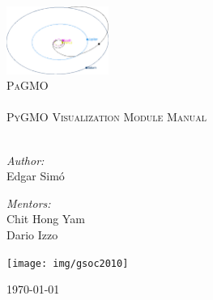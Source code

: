 \begin{titlepage}

\begin{center}

\vfill

\vspace*{2 cm}

\includegraphics[width=0.25\textwidth]{img/cover}\\[1cm]

\textsc{\LARGE PaGMO}\\[0.5cm]
\HRule \\[0.5cm]
\textsc{\Large PyGMO Visualization Module Manual}\\[0.5cm]
\HRule \\[1.5cm]


\begin{minipage}{0.4\textwidth}
\begin{flushleft} \large
\emph{Author:}\\
Edgar Sim\'{o}
\end{flushleft}
\end{minipage}
\begin{minipage}{0.4\textwidth}
\begin{flushright} \large
\emph{Mentors:} \\
Chit Hong Yam \\
Dario Izzo
\end{flushright}
\end{minipage}

\vspace{2 cm}

\texttt{[image: img/gsoc2010]}\\[1cm]

\vfill

{\large \today}

\end{center}

\end{titlepage}
